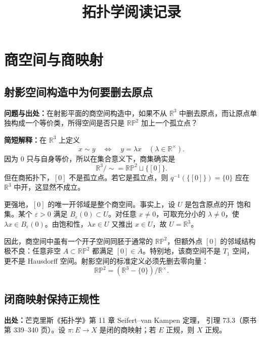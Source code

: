 \documentclass[11pt,a4paper]{ctexart}
\title{拓扑学阅读记录}
\author{}
\date{}
\begin{document}
\maketitle

\section{商空间与商映射}

\subsection{射影空间构造中为何要删去原点}
\label{note:topology-projective-space-origin}

\textbf{问题与出处：}在射影平面的商空间构造中，如果不从
$\mathbb R^3$ 中删去原点，而让原点单独构成一个等价类，所得空间是否只是
$\mathbb{RP}^2$ 加上一个孤立点？

\textbf{简短解释：}在 $\mathbb R^3$ 上定义
\[
 x\sim y\quad\Longleftrightarrow\quad y=\lambda x
 \quad(\lambda\in\mathbb R^\times).
\]
因为 $0$ 只与自身等价，所以在集合意义下，商集确实是
\[
 \mathbb R^3/{\sim}=\mathbb{RP}^2\sqcup\{[0]\}.
\]
但在商拓扑下，$[0]$ 不是孤立点。若它是孤立点，则
$q^{-1}(\{[0]\})=\{0\}$ 应在 $\mathbb R^3$ 中开，这显然不成立。

更强地，$[0]$ 的唯一开邻域是整个商空间。事实上，设 $U$ 是包含原点的开
饱和集。某个 $\varepsilon>0$ 满足 $B_\varepsilon(0)\subset U$。对任意
$x\ne0$，可取充分小的 $\lambda\ne0$，使
$\lambda x\in B_\varepsilon(0)$。由饱和性，$\lambda x\in U$ 又推出
$x\in U$，故 $U=\mathbb R^3$。

因此，商空间中虽有一个开子空间同胚于通常的 $\mathbb{RP}^2$，但额外点
$[0]$ 的邻域结构极不良：任意非空 $A\subset\mathbb{RP}^2$ 都满足
$[0]\in\overline A$。特别地，该商空间不是 $T_1$ 空间，更不是 Hausdorff
空间。射影空间的标准定义必须先删去零向量：
\[
 \mathbb{RP}^2=(\mathbb R^3-\{0\})/\mathbb R^\times.
\]


\subsection{闭商映射保持正规性}
\label{note:topology-quotient-closed-map-normality}

\textbf{出处：}芒克里斯《拓扑学》第 11 章 Seifert--van Kampen 定理，
引理 73.3（原书第 339--340 页）。设 $\pi:E\to X$ 是闭的商映射；若
$E$ 正规，则 $X$ 正规。
\end{document}
